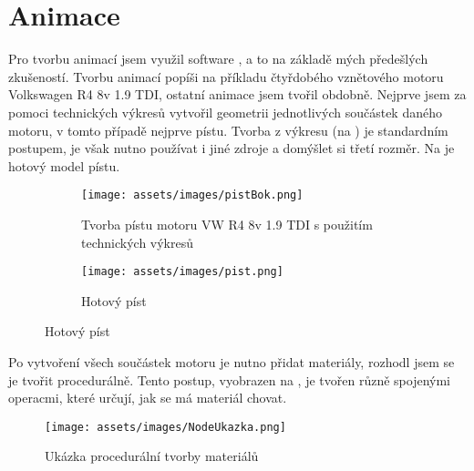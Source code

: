 \section{Animace}\label{sc:animace}
{Pro tvorbu animací jsem využil software , a to na základě mých předešlých zkušeností. Tvorbu animací popíši na příkladu čtyřdobého vznětového motoru Volkswagen R4 8v 1.9 TDI, ostatní animace jsem tvořil obdobně.}\odst
{Nejprve jsem za pomoci technických výkresů vytvořil geometrii jednotlivých součástek daného motoru, v tomto případě nejprve pístu. Tvorba z výkresu (na ) je standardním postupem, je však nutno používat i jiné zdroje a domýšlet si třetí rozměr. Na  je hotový model pístu.}
\begin{figure}[H]
    \centering
    \begingroup
    \makeatletter
    \renewcommand\thesubfigure{\thefigure~--~\@nameuse{subfiglabel@\alph{subfigure}}}
    \newcommand{\subfiglabel@a}{vlevo}
    \newcommand{\subfiglabel@b}{vpravo}
    \captionsetup[subfigure]{labelformat=simple, labelsep=colon}
    \renewcommand\p@subfigure{}
    \makeatother
    \begin{subfigure}{.5\textwidth}
        \centering
        \texttt{[image: assets/images/pistBok.png]}
        \caption{Tvorba pístu motoru VW R4 8v 1.9 TDI s použitím technických výkresů \jaObr}
        \label{obr:pistVykresy}
    \end{subfigure}%
    \begin{subfigure}{.5\textwidth}
        \centering
        \texttt{[image: assets/images/pist.png]}
        \caption{Hotový píst \jaObr}
        \label{obr:pistHotovy}
    \end{subfigure}
    \endgroup
\end{figure}
{Po vytvoření všech součástek motoru je nutno přidat materiály, rozhodl jsem se je tvořit procedurálně. Tento postup, vyobrazen na , je tvořen různě spojenými operacmi, které určují, jak se má materiál chovat.}
\begin{figure}[H]
    \centering
    \texttt{[image: assets/images/NodeUkazka.png]}
    \caption{Ukázka procedurální tvorby materiálů \jaObr}
    \label{obr:NodeUkazka}
\end{figure}

